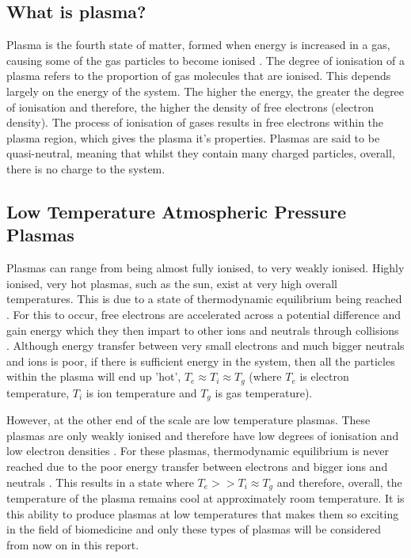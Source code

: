 \documentclass[11pt, oneside]{article}   	%
\begin{document}

\subsection{What is plasma?}
Plasma is the fourth state of matter, formed when energy is increased in a gas, causing some of the gas particles to become ionised \cite{Fridman2013PlasmaMedicine}. 
The degree of ionisation of a plasma refers to the proportion of gas molecules that are ionised.
This depends largely on the energy of the system. 
The higher the energy, the greater the degree of ionisation and therefore, the higher the density of free electrons (electron density).
The process of ionisation of gases results in free electrons within the plasma region, which gives the plasma it's properties.
Plasmas are said to be quasi-neutral, meaning that whilst they contain many charged particles, overall, there is no charge to the system.

\subsection{Low Temperature Atmospheric Pressure Plasmas} \label{section:LowTempPlasmas}

Plasmas can range from being almost fully ionised, to very weakly ionised.
Highly ionised, very hot plasmas, such as the sun, exist at very high overall temperatures. 
This is due to a state of thermodynamic equilibrium being reached \cite{Fridman2013PlasmaMedicine}. 
For this to occur, free electrons are accelerated across a potential difference and gain energy which they then impart to other ions and neutrals through collisions \cite{Hirst2015}.
Although energy transfer between very small electrons and much bigger neutrals and ions is poor, if there is sufficient energy in the system, then all the particles within the plasma will end up 'hot', $T_e \approx T_i \approx T_g$ (where $T_e$ is electron temperature, $T_i$ is ion temperature and $T_g$ is gas temperature).

However, at the other end of the scale are low temperature plasmas. 
These plasmas are only weakly ionised and therefore have low degrees of ionisation and low electron densities \cite{Fridman2013PlasmaMedicine}.
For these plasmas, thermodynamic equilibrium is never reached due to the poor energy transfer between electrons and bigger ions and neutrals \cite{Fridman2008}. 
This results in a state where $T_e >> T_i \approx T_g$ and therefore, overall, the temperature of the plasma remains cool at approximately room temperature.
It is this ability to produce plasmas at low temperatures that makes them so exciting in the field of biomedicine and only these types of plasmas will be considered from now on in this report.
\end{document}
